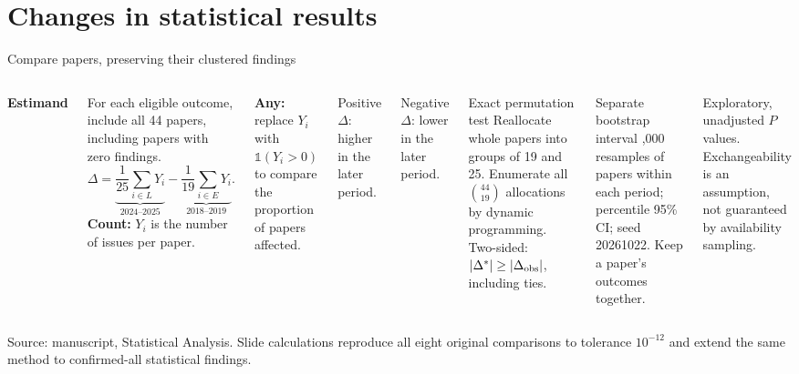 \documentclass[10pt,aspectratio=169]{beamer}
\newcommand{\src}[1]{\par\vfill{\color{Slate}\fontsize{6.5}{8}\selectfont #1\par}}
\newcommand{\smalltext}{\fontsize{8.5}{10.4}\selectfont}
\begin{document}
\section{Changes in statistical results}
\begin{frame}[t]{Compare papers, preserving their clustered findings}
\begin{columns}[T,onlytextwidth]
\textbf{Estimand}\par
\small
For each eligible outcome, include all 44 papers, including papers with zero findings.
\[
\Delta=\underbrace{\frac{1}{25}\sum_{i\in L}Y_i}_{\text{2024--2025}}-
\underbrace{\frac{1}{19}\sum_{i\in E}Y_i}_{\text{2018--2019}}.
\]
\small
\textbf{Count:} $Y_i$ is the number of issues per paper.\par\medskip
\textbf{Any:} replace $Y_i$ with $\mathbb{1}(Y_i>0)$ to compare the proportion of papers affected.\par\medskip
Positive $\Delta$: higher in the later period.\par
Negative $\Delta$: lower in the later period.
\begin{block}{Exact permutation test}
\smalltext
Reallocate whole papers into groups of 19 and 25. Enumerate all $\binom{44}{19}$ allocations by dynamic programming. Two-sided: $|\Delta^*|\geq|\Delta_{\rm obs}|$, including ties.
\end{block}
\begin{block}{Separate bootstrap interval}
\smalltext
20,000 resamples of papers within each period; percentile 95\% CI; seed 20261022. Keep a paper's outcomes together.
\end{block}
\smalltext
Exploratory, unadjusted $P$ values. Exchangeability is an assumption, not guaranteed by availability sampling.
\end{columns}
\src{Source: manuscript, Statistical Analysis. Slide calculations reproduce all eight original comparisons to tolerance $10^{-12}$ and extend the same method to confirmed-all statistical findings.}
\end{frame}
\end{document}
